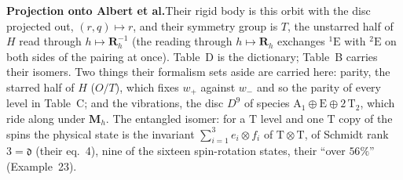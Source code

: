 \documentclass[12pt]{article}
\newcommand{\Rmat}{\mathbf{R}}              %
\begin{document}
{

\noindent\textbf{Projection onto Albert et al.}\quad Their rigid body is this orbit with the disc projected out,
$(r,q)\mapsto r$, and their symmetry group is $T$, the unstarred half of $H$ read through $h\mapsto\Rmat_h^{-1}$
(the reading through $h\mapsto\Rmat_h$ exchanges ${}^1\mathrm E$ with ${}^2\mathrm E$ on both sides of the pairing
at once). Table~D is the dictionary; Table~B carries their isomers. Two things their formalism sets aside are
carried here: parity, the starred half of $H$ ($O/T$), which fixes $w_+$ against $w_-$ and so the parity of every
level in Table~C; and the vibrations, the disc $D^9$ of species $\mathrm A_1\oplus\mathrm E\oplus2\,\mathrm T_2$,
which ride along under $\mathbf M_h$. The entangled isomer: for a $\mathrm T$ level and one $\mathrm T$ copy of the
spins the physical state is the invariant $\sum_{i=1}^3e_i\otimes f_i$ of $\mathrm T\otimes\mathrm T$, of Schmidt
rank $3=\mathfrak d$ (their eq.~4), nine of the sixteen spin-rotation states, their ``over $56\%$'' (Example~23).

}
\end{document}
